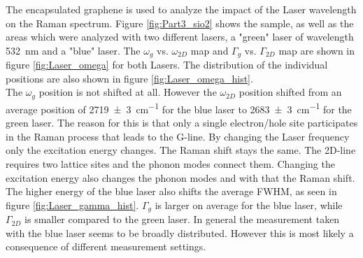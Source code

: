 \documentclass[12pt,a4paper]{article}
\begin{document}
The encapsulated graphene is used to analyze the impact of the Laser wavelength on the Raman spectrum. Figure \ref{fig:Part3_sio2} shows the sample, as well as the areas which were analyzed with two different lasers, a "green" laser of wavelength \SI{532}{nm} and a "blue" laser. The $\omega_g$ vs. $\omega_{2D}$ map and $\Gamma_g$ vs. $\Gamma_{2D}$ map are shown in figure \ref{fig:Laser_omega} for both Lasers. The distribution of the individual positions are also shown in figure \ref{fig:Laser_omega_hist}.\\
The $\omega_g$ position is not shifted at all. However the $\omega_{2D}$ position shifted from an average position of \SI{2719(3)}{cm^{-1}} for the blue laser to \SI{2683(3)}{cm^{-1}} for the green laser. The reason for this is that only a single electron/hole site participates in the Raman process that leads to the G-line. By changing the Laser frequency only the excitation energy changes. The Raman shift stays the same. The 2D-line requires two lattice sites and the phonon modes connect them. Changing the excitation energy also changes the phonon modes and with that the Raman shift.\\
The higher energy of the blue laser also shifts the average FWHM, as seen in figure \ref{fig:Laser_gamma_hist}. $\Gamma_g$ is larger on average for the blue laser, while $\Gamma_{2D}$ is smaller compared to the green laser. In general the measurement taken with the blue laser seems to be broadly distributed. However this is most likely a consequence of different measurement settings.\\
\\
\end{document}
